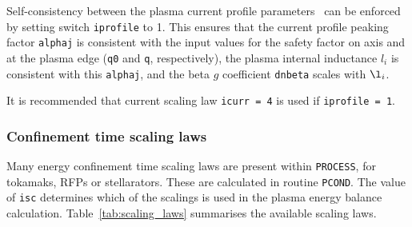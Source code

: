 \documentclass[11pt,a4paper]{report}
\newcommand{\process}{\mbox{\texttt{PROCESS}}}
\begin{document}
Self-consistency between the plasma current profile
parameters~\cite{DEMOPhysicsGuidelines} can be enforced by setting switch
\texttt{iprofile} to 1. This ensures that the current profile peaking factor
\texttt{alphaj} is consistent with the input values for the safety factor on
axis and at the plasma edge (\texttt{q0} and \texttt{q}, respectively), the
plasma internal inductance $l_i$ is consistent with this \texttt{alphaj}, and
the beta $g$ coefficient \texttt{dnbeta} scales with $\l_i$.

It is recommended that current scaling law \texttt{icurr = 4} is used if
\texttt{iprofile = 1}.

\subsubsection{Confinement time scaling laws}

Many energy confinement time scaling laws are present within \process, for
tokamaks, RFPs or stellarators. These are calculated in routine
\texttt{PCOND}. The value of \texttt{isc} determines which of the scalings is
used in the plasma energy balance calculation.  Table~\ref{tab:scaling_laws}
summarises the available scaling laws.
\end{document}
